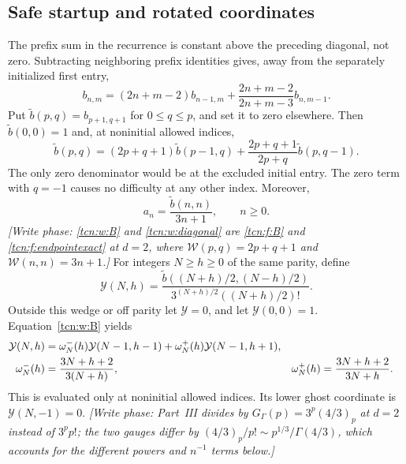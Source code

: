 \documentclass[11pt,letterpaper]{article}
\theoremstyle{remark}
\begin{document}
\subsection{Safe startup and rotated coordinates}
The prefix sum in the recurrence is constant above the preceding diagonal, not zero. Subtracting neighboring prefix identities gives, away from the separately initialized first entry,
\[
 b_{n,m}=(2n+m-2)b_{n-1,m}
       +\frac{2n+m-2}{2n+m-3}b_{n,m-1}.
\]
Put $\widetilde b(p,q)=b_{p+1,q+1}$ for $0\le q\le p$, and set it to zero elsewhere. Then $\widetilde b(0,0)=1$ and, at noninitial allowed indices,
\begin{equation}\label{tcn:w:B}
 \widetilde b(p,q)=(2p+q+1)\widetilde b(p-1,q)
       +\frac{2p+q+1}{2p+q}\widetilde b(p,q-1).
\end{equation}
The only zero denominator would be at the excluded initial entry. The zero term with $q=-1$ causes no difficulty at any other index. Moreover,
\begin{equation}\label{tcn:w:diagonal}
 a_n=\frac{\widetilde b(n,n)}{3n+1},\qquad n\ge0.
\end{equation}
\emph{[Write phase: \eqref{tcn:w:B} and \eqref{tcn:w:diagonal} are \eqref{tcn:f:B} and \eqref{tcn:f:endpointexact} at $d=2$, where $\mathcal W(p,q)=2p+q+1$ and $\mathcal W(n,n)=3n+1$.]}
For integers $N\ge h\ge0$ of the same parity, define
\[
 \mathcal Y(N,h)=\frac{\widetilde b((N+h)/2,(N-h)/2)}{3^{(N+h)/2}((N+h)/2)!}.
\]
Outside this wedge or off parity let $\mathcal Y=0$, and let $\mathcal Y(0,0)=1$. Equation~\eqref{tcn:w:B} yields
\begin{align}
 \mathcal Y(N,h)&=\omega^-_N(h)\mathcal Y(N-1,h-1)+\omega^+_N(h)\mathcal Y(N-1,h+1),\label{tcn:w:walk}\\
 \omega^-_N(h)&=\frac{3N+h+2}{3(N+h)},&
 \omega^+_N(h)&=\frac{3N+h+2}{3N+h}.\notag
\end{align}
This is evaluated only at noninitial allowed indices. Its lower ghost coordinate is $\mathcal Y(N,-1)=0$. \emph{[Write phase: Part~III divides by $G_\Gamma(p)=3^p(4/3)_p$ at $d=2$ instead of $3^pp!$; the two gauges differ by $(4/3)_p/p!\sim p^{1/3}/\Gamma(4/3)$, which accounts for the different powers and $n^{-1}$ terms below.]}
\end{document}
